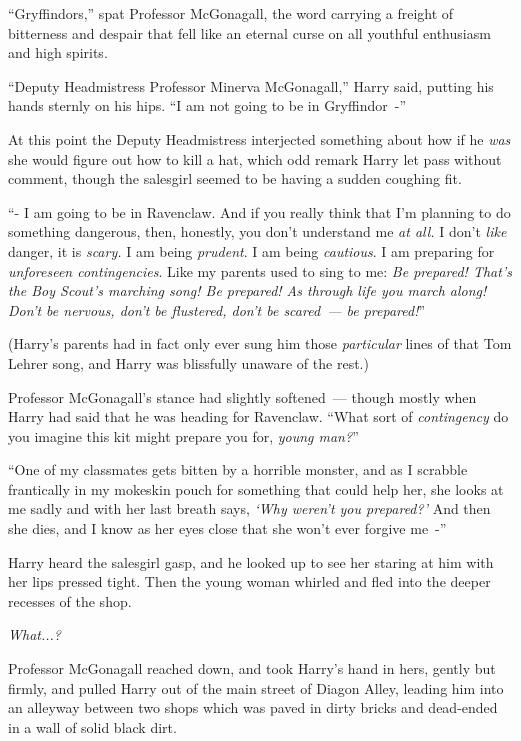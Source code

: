 ``Gryffindors,'' spat Professor McGonagall, the word carrying a freight of bitterness and despair that fell like an eternal curse on all youthful enthusiasm and high spirits.

``Deputy Headmistress Professor Minerva McGonagall,'' Harry said, putting his hands sternly on his hips. ``I am not going to be in Gryffindor~-''

At this point the Deputy Headmistress interjected something about how if he \emph{was} she would figure out how to kill a hat, which odd remark Harry let pass without comment, though the salesgirl seemed to be having a sudden coughing fit.

``- I am going to be in Ravenclaw. And if you really think that I'm planning to do something dangerous, then, honestly, you don't understand me \emph{at all.} I don't \emph{like} danger, it is \emph{scary.} I am being \emph{prudent}. I am being \emph{cautious}. I am preparing for \emph{unforeseen contingencies}. Like my parents used to sing to me: \emph{Be prepared! That's the Boy Scout's marching song! Be prepared! As through life you march along! Don't be nervous, don't be flustered, don't be scared~--- be prepared!}''

(Harry's parents had in fact only ever sung him those \emph{particular} lines of that Tom Lehrer song, and Harry was blissfully unaware of the rest.)

Professor McGonagall's stance had slightly softened~--- though mostly when Harry had said that he was heading for Ravenclaw. ``What sort of \emph{contingency} do you imagine this kit might prepare you for, \emph{young man?}''

``One of my classmates gets bitten by a horrible monster, and as I scrabble frantically in my mokeskin pouch for something that could help her, she looks at me sadly and with her last breath says, \emph{`Why weren't you prepared?'} And then she dies, and I know as her eyes close that she won't ever forgive me~-''

Harry heard the salesgirl gasp, and he looked up to see her staring at him with her lips pressed tight. Then the young woman whirled and fled into the deeper recesses of the shop.

\emph{What...?}

Professor McGonagall reached down, and took Harry's hand in hers, gently but firmly, and pulled Harry out of the main street of Diagon Alley, leading him into an alleyway between two shops which was paved in dirty bricks and dead-ended in a wall of solid black dirt.

